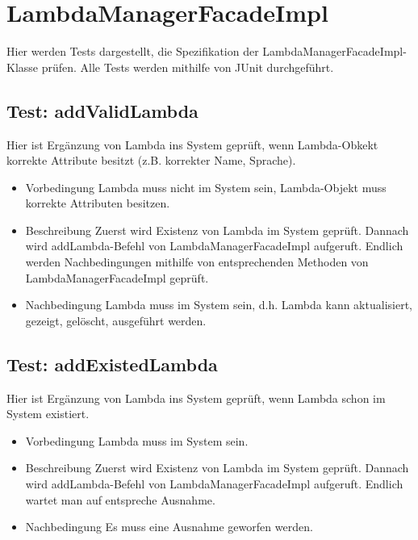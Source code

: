 \documentclass[a4paper,20pt,oneside]{book}
\begin{document}
\newpage
\section{LambdaManagerFacadeImpl}
Hier werden Tests dargestellt, die Spezifikation der LambdaManagerFacadeImpl-Klasse prüfen. Alle Tests werden mithilfe von JUnit durchgeführt.

\subsection{Test: addValidLambda}
Hier ist Ergänzung von Lambda ins System geprüft, wenn Lambda-Obkekt korrekte Attribute besitzt (z.B. korrekter Name, Sprache).
\begin{itemize}
	\item Vorbedingung \linebreak
	Lambda muss nicht im System sein, Lambda-Objekt muss korrekte Attributen besitzen.
	\item Beschreibung \linebreak
	Zuerst wird Existenz von Lambda im System geprüft. Dannach wird addLambda-Befehl von LambdaManagerFacadeImpl aufgeruft. Endlich werden Nachbedingungen mithilfe von  entsprechenden Methoden von LambdaManagerFacadeImpl geprüft.
	\item Nachbedingung \linebreak
	Lambda muss im System sein, d.h. Lambda kann aktualisiert, gezeigt, gelöscht, ausgeführt werden.
\end{itemize}
\subsection{Test: addExistedLambda}
Hier ist Ergänzung von Lambda ins System geprüft, wenn Lambda schon im System existiert.
\begin{itemize}
	\item Vorbedingung \linebreak
	Lambda muss im System sein.
	\item Beschreibung \linebreak
	Zuerst wird Existenz von Lambda im System geprüft. Dannach wird addLambda-Befehl von LambdaManagerFacadeImpl aufgeruft. Endlich wartet man auf entspreche Ausnahme.
	\item Nachbedingung \linebreak
	Es muss eine Ausnahme geworfen werden.
\end{itemize}
\end{document}
